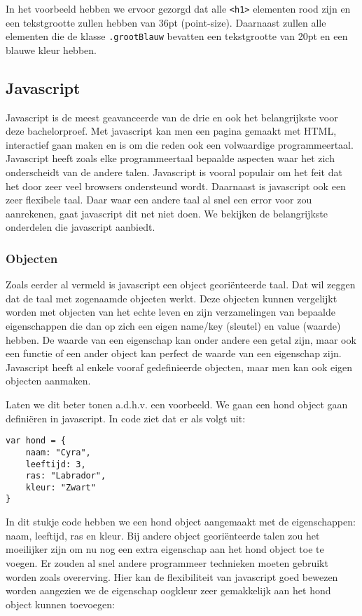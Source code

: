 In het voorbeeld hebben we ervoor gezorgd dat alle \lstinline[basicstyle=\ttfamily\color{red}]|<h1>| elementen rood zijn en een tekstgrootte zullen hebben van 36pt (point-size). Daarnaast zullen alle elementen die de klasse \lstinline[basicstyle=\ttfamily\color{red}]|.grootBlauw| bevatten een tekstgrootte van 20pt en een blauwe kleur hebben.

\subsection{Javascript}
\label{subsec:Web VR}
Javascript is de meest geavanceerde van de drie en ook het belangrijkste voor deze bachelorproef. Met javascript kan men een pagina gemaakt met HTML, interactief gaan maken en is om die reden ook een volwaardige programmeertaal. Javascript heeft zoals elke programmeertaal bepaalde aspecten waar het zich onderscheidt van de andere talen. Javascript is vooral populair om het feit dat het door zeer veel browsers ondersteund wordt. Daarnaast is javascript ook een zeer flexibele taal. Daar waar een andere taal al snel een error voor zou aanrekenen, gaat javascript dit net niet doen. We bekijken de belangrijkste onderdelen die javascript aanbiedt.

\subsubsection{Objecten}
\label{sssec:objecten}
Zoals eerder al vermeld is javascript een object georiënteerde taal. Dat wil zeggen dat de taal met zogenaamde objecten werkt. Deze objecten kunnen vergelijkt worden met objecten van het echte leven en zijn verzamelingen van bepaalde eigenschappen die dan op zich een eigen name/key (sleutel) en value (waarde) hebben. De waarde van een eigenschap kan onder andere een getal zijn, maar ook een functie of een ander object kan perfect de waarde van een eigenschap zijn. Javascript heeft al enkele vooraf gedefinieerde objecten, maar men kan ook eigen objecten aanmaken.

Laten we dit beter tonen a.d.h.v. een voorbeeld. We gaan een hond object gaan definiëren in javascript. In code ziet dat er als volgt uit:

\begin{lstlisting}[frame=single, caption=Hond object aanmaken in javascript]
var hond = {
	naam: "Cyra",
	leeftijd: 3,
	ras: "Labrador",
	kleur: "Zwart"
}
\end{lstlisting}

In dit stukje code hebben we een hond object aangemaakt met de eigenschappen: naam, leeftijd, ras en kleur. Bij andere object georiënteerde talen zou het moeilijker zijn om nu nog een extra eigenschap aan het hond object toe te voegen. Er zouden al snel andere programmeer technieken moeten gebruikt worden zoals overerving. Hier kan de flexibiliteit van javascript goed bewezen worden aangezien we de eigenschap oogkleur zeer gemakkelijk aan het hond object kunnen toevoegen:

